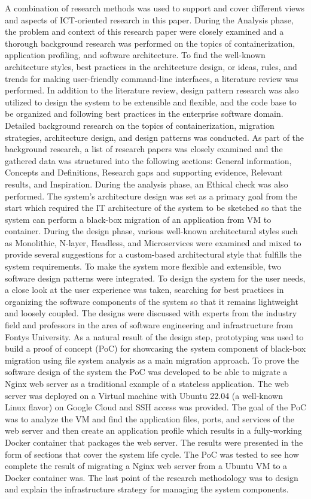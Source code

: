 \documentclass[twocolumn]{article}
\begin{document}
A combination of research methods was used to support and cover different views and aspects of ICT-oriented research in this paper. During the Analysis phase, the problem and context of this research paper were closely examined and a thorough background research was performed on the topics of containerization, application profiling, and software architecture. To find the well-known architecture styles, best practices in the architecture design, or ideas, rules, and trends for making user-friendly command-line interfaces, a literature review was performed. In addition to the literature review, design pattern research was also utilized to design the system to be extensible and flexible, and the code base to be organized and following best practices in the enterprise software domain. Detailed background research on the topics of containerization, migration strategies, architecture design, and design patterns was conducted. As part of the background research, a list of research papers was closely examined and the gathered data was structured into the following sections: General information, Concepts and Definitions, Research gaps and supporting evidence, Relevant results, and Inspiration. During the analysis phase, an Ethical check was also performed.
The system's architecture design was set as a primary goal from the start which required the IT architecture of the system to be sketched so that the system can perform a black-box migration of an application from VM to container. During the design phase, various well-known architectural styles such as Monolithic, N-layer, Headless, and Microservices were examined and mixed to provide several suggestions for a custom-based architectural style that fulfills the system requirements. To make the system more flexible and extensible, two software design patterns were integrated. To design the system for the user needs, a close look at the user experience was taken, searching for best practices in organizing the software components of the system so that it remains lightweight and loosely coupled. The designs were discussed with experts from the industry field and professors in the area of software engineering and infrastructure from Fontys University.
As a natural result of the design step, prototyping was used to build a proof of concept (PoC) for showcasing the system component of black-box migration using file system analysis as a main migration approach. To prove the software design of the system the PoC was developed to be able to migrate a Nginx web server as a traditional example of a stateless application. The web server was deployed on a Virtual machine with Ubuntu 22.04 (a well-known Linux flavor) on Google Cloud and SSH access was provided. The goal of the PoC was to analyze the VM and find the application files, ports, and services of the web server and then create an application profile which results in a fully-working Docker container that packages the web server. The results were presented in the form of sections that cover the system life cycle. The PoC was tested to see how complete the result of migrating a Nginx web server from a Ubuntu VM to a Docker container was. The last point of the research methodology was to design and explain the infrastructure strategy for managing the system components.
\end{document}
